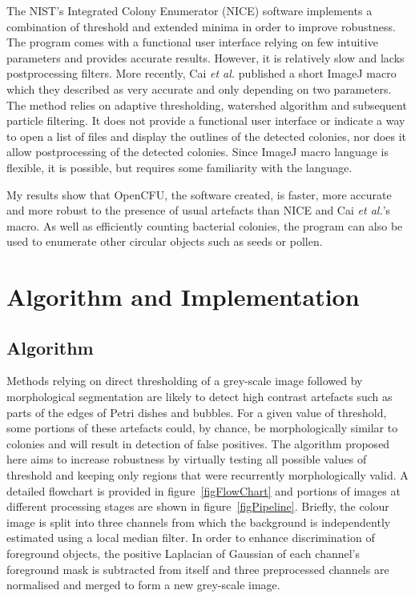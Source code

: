\documentclass[10pt]{article}
\begin{document}
The NIST's Integrated Colony Enumerator (NICE)\cite{clarke_lowcost_2010}
software
implements a combination of threshold and extended minima in order to improve robustness.
The program comes with a functional user interface relying on few intuitive parameters
and provides accurate results. 
However, it is relatively slow and lacks
postprocessing filters.
More recently, Cai \emph{et al.} published\cite{cai_optimized_2011} a short
ImageJ macro which they described as very accurate and only depending on two parameters.
The method relies on adaptive thresholding, watershed algorithm and subsequent particle filtering.
It does not provide a functional user interface or indicate a way to open a list
of files and display the outlines of the detected colonies, nor does it allow
postprocessing of the detected colonies. 
Since ImageJ macro language is
flexible, it is possible, but requires some familiarity with the language.

My results show that OpenCFU, the software created, is faster, more accurate and
more robust to the presence of usual artefacts than NICE and Cai \emph{et al.}'s macro.
As well as efficiently counting
bacterial colonies, the program can also 
be used to enumerate
other circular objects such as seeds or pollen. 

\section*{Algorithm and Implementation}

\subsection*{Algorithm} 
Methods relying on direct thresholding of a grey-scale image followed
by morphological segmentation are likely to detect high contrast artefacts such
as parts of the edges of Petri dishes and bubbles.  For a given value of threshold,
some portions of these artefacts could, by chance, be morphologically similar to colonies and will result in
detection of false positives.
The algorithm proposed here aims to increase robustness by virtually testing
all possible values of threshold and keeping only regions that were recurrently morphologically
valid. A detailed flowchart is provided in figure~\ref{figFlowChart} and portions of images 
at different processing stages are shown in figure~\ref{figPipeline}.
Briefly, the colour image is split into three channels from which the background
is independently estimated using a local median filter.
In order to enhance discrimination of foreground objects,  the positive
Laplacian of Gaussian of each channel's foreground mask is subtracted from
itself and three preprocessed channels are normalised and merged to form a
new grey-scale image.
\end{document}
